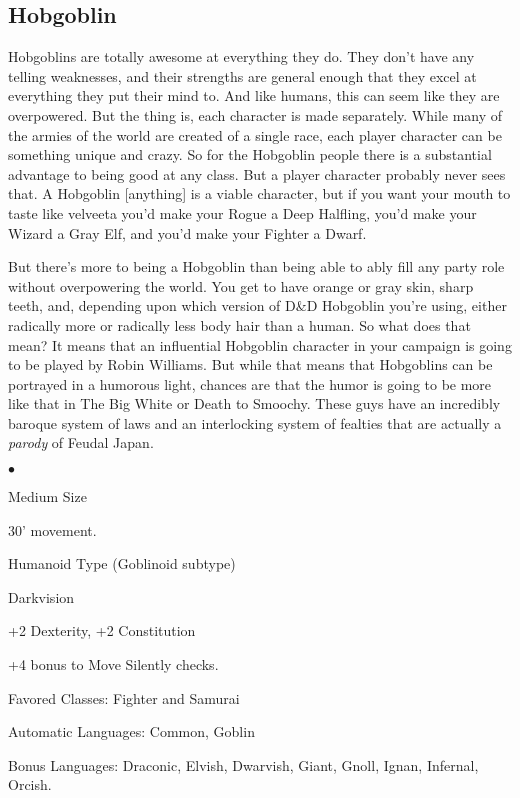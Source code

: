 \subsection{Hobgoblin}
\vspace*{-8pt}

Hobgoblins are totally awesome at everything they do. They don't have any telling weaknesses, and their strengths are general enough that they excel at everything they put their mind to. And like humans, this can seem like they are overpowered. But the thing is, each character is made separately. While many of the armies of the world are created of a single race, each player character can be something unique and crazy. So for the Hobgoblin people there is a substantial advantage to being good at any class. But a player character probably never sees that. A Hobgoblin [anything] is a viable character, but if you want your mouth to taste like velveeta you'd make your Rogue a Deep Halfling, you'd make your Wizard a Gray Elf, and you'd make your Fighter a Dwarf.

But there's more to being a Hobgoblin than being able to ably fill any party role without overpowering the world. You get to have orange or gray skin, sharp teeth, and, depending upon which version of D\&D Hobgoblin you're using, either radically more or radically less body hair than a human. So what does that mean? It means that an influential Hobgoblin character in your campaign is going to be played by Robin Williams. But while that means that Hobgoblins can be portrayed in a humorous light, chances are that the humor is going to be more like that in The Big White or Death to Smoochy. These guys have an incredibly baroque system of laws and an interlocking system of fealties that are actually a \textit{parody} of Feudal Japan.

\begin{list}{$\bullet$}{\itemspace}
    \item Medium Size
    \item 30' movement.
    \item Humanoid Type (Goblinoid subtype)
    \item Darkvision
    \item +2 Dexterity, +2 Constitution
    \item +4 bonus to Move Silently checks.
    \item Favored Classes: Fighter and Samurai
    \item Automatic Languages: Common, Goblin
    \item Bonus Languages: Draconic, Elvish, Dwarvish, Giant, Gnoll, Ignan, Infernal, Orcish.
\end{list}

